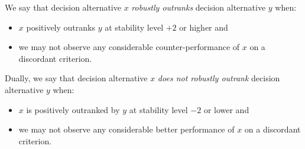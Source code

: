 We say that decision alternative $x$ \emph{robustly outranks} decision alternative $y$ when:
\begin{itemize}[nosep]
\item $x$ positively outranks $y$ at stability level $+2$ or higher and
\item we may not observe any considerable counter-performance of $x$ on a discordant criterion.
\end{itemize}
Dually, we say that decision alternative $x$ \emph{does not robustly outrank} decision alternative $y$ when:
\begin{itemize}
\item $x$ is positively outranked by $y$ at stability level $-2$ or lower and
\item we may not observe any considerable better performance of $x$ on a discordant criterion.
\end{itemize}     

